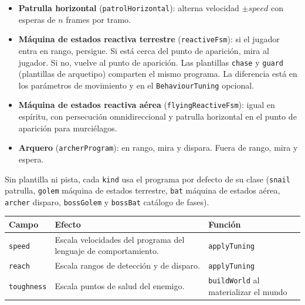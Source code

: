 \begin{itemize}
  \item \textbf{Patrulla horizontal} (\texttt{patrolHorizontal}): alterna
    velocidad $\pm speed$ con esperas de $n$ frames por tramo.
  \item \textbf{Máquina de estados reactiva terrestre} (\texttt{reactiveFsm}): si el
    jugador entra en rango, persigue. Si está cerca del punto de aparición, mira al
    jugador. Si no, vuelve al punto de aparición. Las plantillas \texttt{chase} y
    \texttt{guard} (plantillas de arquetipo) comparten el mismo programa. La diferencia está en los
    parámetros de movimiento y en el \texttt{Behaviour\-Tuning} opcional.
  \item \textbf{Máquina de estados reactiva aérea} (\texttt{flyingReactiveFsm}): igual en espíritu, con
    persecución omnidireccional y patrulla horizontal en el punto de aparición para murciélagos.
  \item \textbf{Arquero} (\texttt{archerProgram}): en rango, mira y dispara. Fuera
    de rango, mira y espera.
\end{itemize}

Sin plantilla ni pista, cada \texttt{kind} usa el programa por defecto de su
clase (\texttt{snail} patrulla, \texttt{golem} máquina de estados terrestre, \texttt{bat} máquina de estados aérea,
\texttt{archer} disparo, \texttt{bossGolem} y \texttt{bossBat} catálogo de fases).

\begin{samepage}
\begin{center}
  \label{tab:behaviour-tuning}
  \smallskip
  \begin{tabularx}{\textwidth}{@{}>{\raggedright\arraybackslash}p{2.2cm} >{\raggedright\arraybackslash}X >{\raggedright\arraybackslash}X@{}}
    \textbf{Campo} & \textbf{Efecto} & \textbf{Función} \\
    \hline
    \texttt{speed} &
    Escala velocidades del programa del lenguaje de comportamiento. &
    \texttt{applyTuning} \\
    \texttt{reach} &
    Escala rangos de detección y de disparo. &
    \texttt{applyTuning} \\
    \texttt{toughness} &
    Escala puntos de salud del enemigo. &
    \texttt{buildWorld} al materializar el mundo \\
  \end{tabularx}
\end{center}
\end{samepage}

